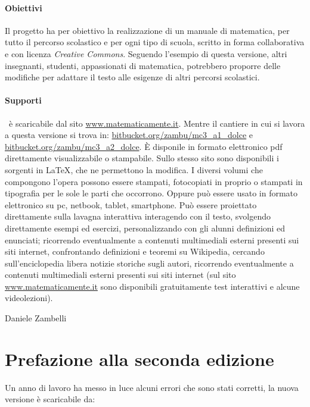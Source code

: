 \paragraph{Obiettivi} Il progetto \emph{\serie} ha per obiettivo la
realizzazione di un manuale di matematica, per tutto il percorso scolastico
e per ogni tipo di scuola, scritto in forma collaborativa e con licenza
\textit{Creative Commons}.
Seguendo l'esempio di questa versione, altri insegnanti, studenti,
appassionati di matematica, potrebbero proporre delle modifiche per adattare
il testo alle esigenze di altri percorsi scolastici.

\paragraph{Supporti}
\serie\ è scaricabile dal sito \url{www.matematicamente.it}.
Mentre il cantiere in cui si lavora a questa versione si trova in:
\url{bitbucket.org/zambu/mc3_a1_dolce} e
\url{bitbucket.org/zambu/mc3_a2_dolce}.
È disponile in formato elettronico pdf direttamente visualizzabile o
stampabile.
Sullo stesso sito sono disponibili i sorgenti in {\LaTeX},
che ne permettono la modifica.
I diversi volumi che compongono l'opera possono essere stampati,
fotocopiati in proprio o stampati in tipografia per le sole le parti che
occorrono.
Oppure può essere usato in formato elettronico su pc, netbook, tablet,
smartphone.
Può essere proiettato direttamente sulla lavagna interattiva
interagendo con il testo, svolgendo direttamente esempi ed esercizi,
personalizzando con gli alunni definizioni ed enunciati;
ricorrendo eventualmente a contenuti multimediali esterni presenti
sui siti internet, confrontando definizioni e teoremi su Wikipedia,
cercando sull'enciclopedia libera notizie storiche sugli autori,
ricorrendo eventualmente a contenuti multimediali esterni presenti sui siti
internet (sul sito \url{www.matematicamente.it} sono disponibili
gratuitamente test interattivi e alcune videolezioni).

\begin{flushright}
Daniele Zambelli
\end{flushright}

\newpage

\section{Prefazione alla seconda edizione}

Un anno di lavoro ha messo in luce alcuni errori che sono stati corretti,
la nuova versione è scaricabile da:

